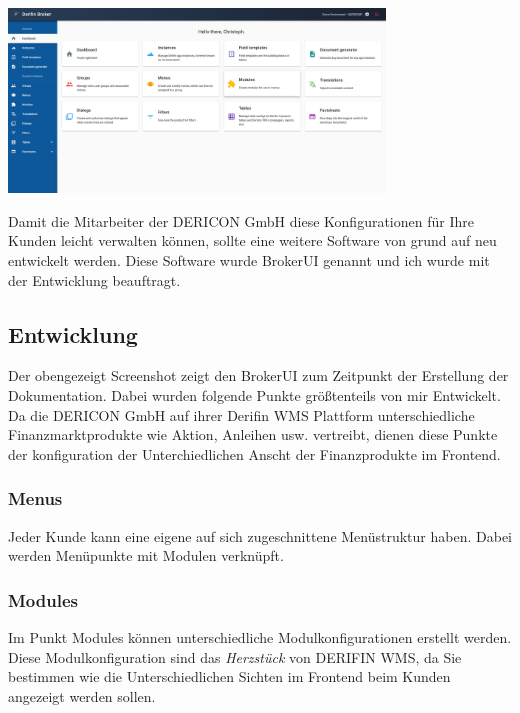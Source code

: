 \documentclass[chapterprefix=false, 12pt, a4paper, oneside, parskip=half, listof=totoc, bibliography=totoc, numbers=noendperiod]{scrbook}
\begin{document}
    \begin{center}
        \includegraphics[width=0.75\textwidth]{img/broker-ui-neu.png}
    \end{center}

    Damit die Mitarbeiter der DERICON GmbH diese Konfigurationen für Ihre Kunden leicht verwalten können, sollte eine
    weitere Software von grund auf neu entwickelt werden. Diese Software wurde BrokerUI genannt und ich wurde mit der
    Entwicklung beauftragt.

    \subsection{Entwicklung}

    Der obengezeigt Screenshot zeigt den BrokerUI zum Zeitpunkt der Erstellung der Dokumentation. Dabei wurden folgende
    Punkte größtenteils von mir Entwickelt. Da die DERICON GmbH auf ihrer Derifin WMS Plattform unterschiedliche Finanzmarktprodukte
    wie Aktion, Anleihen usw. vertreibt, dienen diese Punkte der konfiguration der Unterchiedlichen Anscht der Finanzprodukte im
    Frontend.

    \subsubsection{Menus}

    Jeder Kunde kann eine eigene auf sich zugeschnittene Menüstruktur haben.
    Dabei werden Menüpunkte mit Modulen verknüpft.

    \subsubsection{Modules}

    Im Punkt Modules können unterschiedliche Modulkonfigurationen erstellt werden. Diese Modulkonfiguration sind das \textit{Herzstück}
    von DERIFIN WMS, da Sie bestimmen wie die Unterschiedlichen Sichten im Frontend beim Kunden angezeigt werden sollen.
\end{document}
